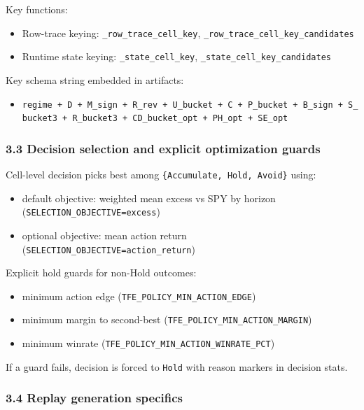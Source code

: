 \documentclass[
]{article}
\providecommand{\tightlist}{%
  \setlength{\itemsep}{0pt}\setlength{\parskip}{0pt}}
\begin{document}
Key functions:

\begin{itemize}
\tightlist
\item
  Row-trace keying: \texttt{\_row\_trace\_cell\_key},
  \texttt{\_row\_trace\_cell\_key\_candidates}
\item
  Runtime state keying: \texttt{\_state\_cell\_key},
  \texttt{\_state\_cell\_key\_candidates}
\end{itemize}

Key schema string embedded in artifacts:

\begin{itemize}
\tightlist
\item
  \texttt{regime\ +\ D\ +\ M\_sign\ +\ R\_rev\ +\ U\_bucket\ +\ C\ +\ P\_bucket\ +\ B\_sign\ +\ S\_bucket3\ +\ R\_bucket3\ +\ CD\_bucket\_opt\ +\ PH\_opt\ +\ SE\_opt}
\end{itemize}

\subsubsection{3.3 Decision selection and explicit optimization
guards}\label{33-decision-selection-and-explicit-optimization-guards}

Cell-level decision picks best among
\texttt{\{Accumulate,\ Hold,\ Avoid\}} using:

\begin{itemize}
\tightlist
\item
  default objective: weighted mean excess vs SPY by horizon
  (\texttt{SELECTION\_OBJECTIVE=excess})
\item
  optional objective: mean action return
  (\texttt{SELECTION\_OBJECTIVE=action\_return})
\end{itemize}

Explicit hold guards for non-Hold outcomes:

\begin{itemize}
\tightlist
\item
  minimum action edge (\texttt{TFE\_POLICY\_MIN\_ACTION\_EDGE})
\item
  minimum margin to second-best
  (\texttt{TFE\_POLICY\_MIN\_ACTION\_MARGIN})
\item
  minimum winrate (\texttt{TFE\_POLICY\_MIN\_ACTION\_WINRATE\_PCT})
\end{itemize}

If a guard fails, decision is forced to \texttt{Hold} with reason
markers in decision stats.

\subsubsection{3.4 Replay generation
specifics}\label{34-replay-generation-specifics}
\end{document}
